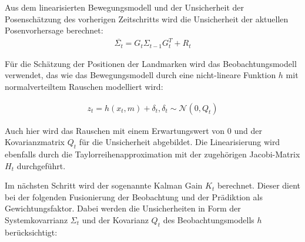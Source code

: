 Aus dem linearisierten Bewegungsmodell und der Unsicherheit der Posenschätzung des vorherigen Zeitschritts wird die Unsicherheit der aktuellen Posenvorhersage berechnet: 
\begin{align}
	\overline{\Sigma_t} = G_t \Sigma_{t-1} G_t^T + R_t 
\end{align}



Für die Schätzung der Positionen der Landmarken wird das Beobachtungsmodell verwendet, das wie das Bewegungsmodell durch eine nicht-lineare Funktion $ h $ mit normalverteiltem Rauschen modelliert wird: 

\begin{align}
	z_t = h(x_t,m)+\delta_t,	\delta_t \sim \mathcal{N}(0,Q_t)
\end{align}

Auch hier wird das Rauschen mit einem Erwartungswert von $ 0 $ und der Kovarianzmatrix $ Q_t $ für die Unsicherheit abgebildet. Die Linearisierung wird ebenfalls durch die Taylorreihenapproximation mit der zugehörigen Jacobi-Matrix $ H_t $ durchgeführt.

Im nächsten Schritt wird der sogenannte Kalman Gain $K_t$ berechnet. Dieser dient bei der folgenden Fusionierung der Beobachtung und der Prädiktion als Gewichtungsfaktor. Dabei werden die Unsicherheiten in Form der Systemkovarrianz $\Sigma_t$ und der Kovarianz $Q_t $ des Beobachtungsmodells $h$ berücksichtigt:

